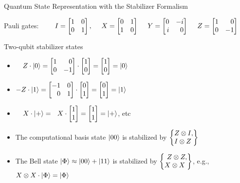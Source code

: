\begin{frame}{Quantum State Representation with the
					\alert{Stabilizer Formalism}}


\vspace{-.5em}
Pauli gates:~~~~ $I = \mat{1&0\\0&1},~~~~X = \mat{0&1\\1&0} ~~~~Y = \mat{0&-i\\i&0}~~~~Z = \mat{1&0\\0&-1}$


\begin{exampleblock}{Two-qubit stabilizer states}

\begin{itemize}
\item ~~$Z \cdot \ket{0} = \mat{1&0\\0&-1} \cdot \mat{1\\0} = \mat{1\\0} = \ket 0$
\item $-Z \cdot \ket{1} = \mat{-1&0\\0&1} \cdot \mat{0\\1} = \mat{0\\1} = \ket 1$
\pause
\item
 ~~$X \cdot \ket{+} = ~~X \cdot \mat{1\\1} = \mat{1\\1} = \ket +$, etc
\pause
\vspace{-.5em}
	\item The computational basis state $\ket{00}$ is stabilized by $\left\{\amat{Z\otimes I,\\ I\otimes Z\phantom,}\right\}$
	\item The Bell state $
    \ket{\Phi} \approx  \ket{00} + \ket{11}
$ is stabilized by $\left\{\amat{Z\otimes Z,\\ X\otimes X\phantom,}\right\}$, \pause e.g., $X\otimes X \cdot \ket{\Phi} = \ket{\Phi}$
\end{itemize}





\end{exampleblock}
\end{frame}
